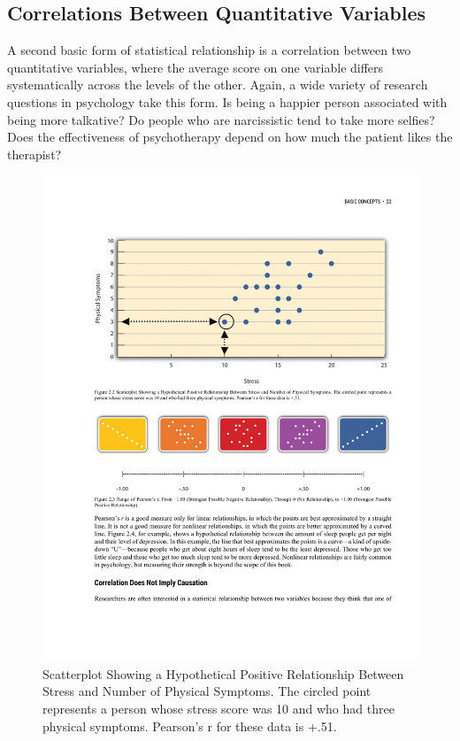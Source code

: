 \documentclass[]{book}
\theoremstyle{definition}
\theoremstyle{definition}
\theoremstyle{remark}
\begin{document}
\subsection{Correlations Between Quantitative
Variables}\label{correlations-between-quantitative-variables}

A second basic form of statistical relationship is a correlation between
two quantitative variables, where the average score on one variable
differs systematically across the levels of the other. Again, a wide
variety of research questions in psychology take this form. Is being a
happier person associated with being more talkative? Do people who are
narcissistic tend to take more selfies? Does the effectiveness of
psychotherapy depend on how much the patient likes the therapist?

\begin{figure}[htbp]
\centering
\includegraphics{figures/C2F3Correlation.pdf}
\caption{Scatterplot Showing a Hypothetical Positive Relationship
Between Stress and Number of Physical Symptoms. The circled point
represents a person whose stress score was 10 and who had three physical
symptoms. Pearson's r for these data is +.51.}
\end{figure}
\end{document}
